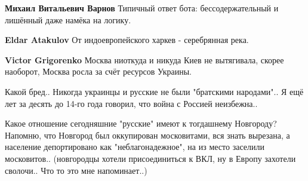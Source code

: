 \begin{itemize}
\begin{itemize}
 
\textbf{Михаил Витальевич Варнов} Типичный ответ бота: бессодержательный и лишённый даже намёка на логику.

 
\textbf{Eldar Atakulov} От индоевропейского харкев - серебрянная река.

 
\textbf{Victor Grigorenko} Москва ниоткуда и никуда Киев не вытягивала, скорее наоборот, Москва росла за счёт ресурсов Украины.

 
Какой бред.. Никогда украинцы и русские не были "братскими народами".. Я ещё
лет за десять до 14-го года говорил, что война с Россией неизбежна..

 

Какое отношение сегодняшние "русские" имеют к тогдашнему Новгороду? Напомню,
что Новгород был оккупирован московитами, вся знать вырезана, а население
депортировано как "неблагонадежное", на из место заселили московитов..
(новгородцы хотели присоединиться к ВКЛ, ну в Европу захотели сволочи.. Что то
это мне напоминает..)


 

\end{itemize}
\end{itemize}
